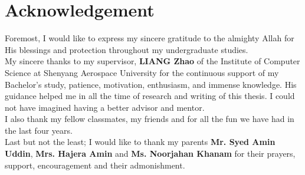 \documentclass[12pt,a4paper]{article}
\newcommand\tab[1][.7cm]{\hspace*{#1}}
\begin{document}
\section*{Acknowledgement}
	\tab Foremost, I would like to express my sincere gratitude to the almighty Allah for His blessings and protection throughout my undergraduate studies.\\ 
\tab My sincere thanks to my supervisor,  \textbf{LIANG Zhao} of the Institute of Computer Science at Shenyang Aerospace University for the continuous support of my Bachelor's study, patience, motivation, enthusiasm, and immense knowledge. His guidance helped me in all the time of research and writing of this thesis. I could not have imagined having a better advisor and mentor.\\
        \tab I also thank my fellow classmates, my friends and for all the fun we have had in the last four years.\\
        \tab Last but not the least; I would like to thank my parents \textbf{Mr. Syed Amin Uddin}, \textbf{Mrs. Hajera Amin} and \textbf{Ms. Noorjahan Khanam} for their prayers, support, encouragement and their admonishment.\\
\end{document}
